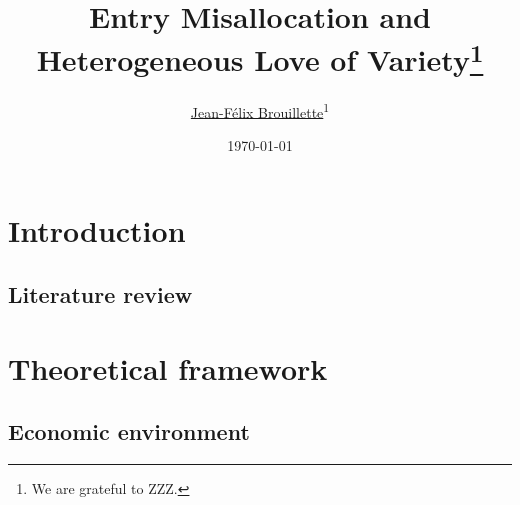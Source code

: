 \documentclass[12pt]{article}
\title{\textbf{Entry Misallocation and \\Heterogeneous Love of Variety}\thanks{We are grateful to ZZZ.}}
\author{\href{https://www.jeanfelixbrouillette.com}{Jean-F\'elix Brouillette}\textsuperscript{1}}
\date{\today}
\begin{document}
\maketitle


\begin{abstract}
\end{abstract}

\clearpage

\section{Introduction}
\label{s:introduction}

\subsection*{Literature review}
\label{s:literature review}

\section{Theoretical framework}
\label{s:theoretical framework}

\subsection{Economic environment}
\label{section:economic environment}
\end{document}
